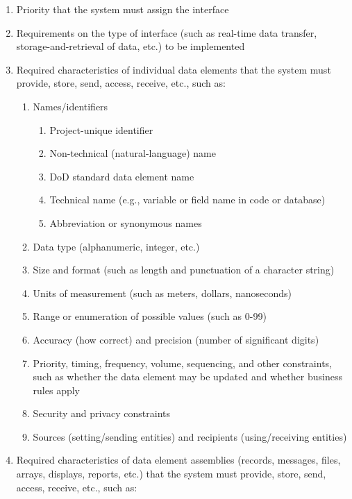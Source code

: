 \begin{enumerate}
\itemsep1pt\parskip0pt
\item
  Priority that the system must assign the interface
\item
  Requirements on the type of interface (such as real-time data
  transfer, storage-and-retrieval of data, etc.) to be implemented
\item
  Required characteristics of individual data elements that the system
  must provide, store, send, access, receive, etc., such as:

  \begin{enumerate}
  \itemsep1pt\parskip0pt
  \item
    Names/identifiers

    \begin{enumerate}
    \itemsep1pt\parskip0pt
    \item
      Project-unique identifier
    \item
      Non-technical (natural-language) name
    \item
      DoD standard data element name
    \item
      Technical name (e.g., variable or field name in code or database)
    \item
      Abbreviation or synonymous names
    \end{enumerate}
  \item
    Data type (alphanumeric, integer, etc.)
  \item
    Size and format (such as length and punctuation of a character
    string)
  \item
    Units of measurement (such as meters, dollars, nanoseconds)
  \item
    Range or enumeration of possible values (such as 0-99)
  \item
    Accuracy (how correct) and precision (number of significant digits)
  \item
    Priority, timing, frequency, volume, sequencing, and other
    constraints, such as whether the data element may be updated and
    whether business rules apply
  \item
    Security and privacy constraints
  \item
    Sources (setting/sending entities) and recipients (using/receiving
    entities)
  \end{enumerate}
\item
  Required characteristics of data element assemblies (records,
  messages, files, arrays, displays, reports, etc.) that the system must
  provide, store, send, access, receive, etc., such as:


\end{enumerate}
